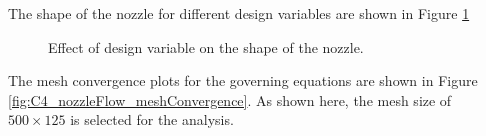 The shape of the nozzle for different design variables are shown in Figure \ref{fig:C4_nozzleShape}
%
\begin{figure}[H]
    \centering
    \quad
    \caption{Effect of design variable on the shape of the nozzle.}
    \label{fig:C4_nozzleShape}
\end{figure}
%
The mesh convergence plots for the governing equations are shown in Figure \ref{fig:C4_nozzleFlow_meshConvergence}. As shown here, the mesh size of $500 \times 125$ is selected for the analysis.
%

